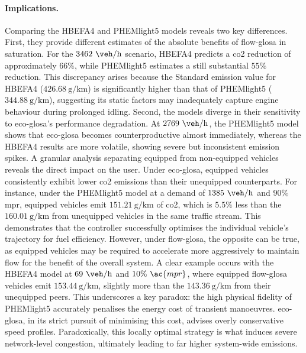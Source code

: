 \paragraph{Implications.}
Comparing the HBEFA4 and PHEMlight5 models reveals two key differences. First, they provide different estimates of the absolute benefits of \ac{flow-glosa} in saturation. For the $3462~\unit{\veh\per\hour}$ scenario, HBEFA4 predicts a \ac{co2} reduction of approximately $66\%$, while PHEMlight5 estimates a still substantial $55\%$ reduction. This discrepancy arises because the Standard emission value for HBEFA4 ($426.68~\unit{\gram\per\kilo\metre}$) is significantly higher than that of PHEMlight5 ($344.88~\unit{\gram\per\kilo\metre}$), suggesting its static factors may inadequately capture engine behaviour during prolonged idling. Second, the models diverge in their sensitivity to \ac{eco-glosa}'s performance degradation. At $2769~\unit{\veh\per\hour}$, the PHEMlight5 model shows that \ac{eco-glosa} becomes counterproductive almost immediately, whereas the HBEFA4 results are more volatile, showing severe but inconsistent emission spikes.
\mynewline
A granular analysis separating equipped from non-equipped vehicles reveals the direct impact on the user. Under \ac{eco-glosa}, equipped vehicles consistently exhibit lower \ac{co2} emissions than their unequipped counterparts. For instance, under the PHEMlight5 model at a demand of $1385~\unit{\veh\per\hour}$ and $90\%$ \ac{mpr}, equipped vehicles emit $151.21~\unit{\gram\per\kilo\metre}$ of \ac{co2}, which is $5.5\%$ less than the $160.01~\unit{\gram\per\kilo\metre}$ from unequipped vehicles in the same traffic stream. This demonstrates that the controller successfully optimises the individual vehicle's trajectory for fuel efficiency. However, under \ac{flow-glosa}, the opposite can be true, as equipped vehicles may be required to accelerate more aggressively to maintain flow for the benefit of the overall system. A clear example occurs with the HBEFA4 model at $69~\unit{\veh\per\hour}$ and $10\%~\ac{mpr}$, where equipped \ac{flow-glosa} vehicles emit $153.44~\unit{\gram\per\kilo\metre}$, slightly more than the $143.36~\unit{\gram\per\kilo\metre}$ from their unequipped peers. This underscores a key paradox: the high physical fidelity of PHEMlight5 accurately penalises the energy cost of transient manoeuvres. \ac{eco-glosa}, in its strict pursuit of minimising this cost, advises overly conservative speed profiles. Paradoxically, this locally optimal strategy is what induces severe network-level congestion, ultimately leading to far higher system-wide emissions.

